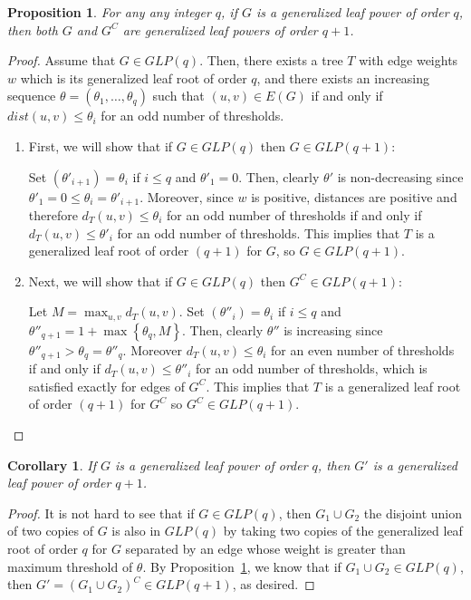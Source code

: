 \documentclass[11pt, letter]{article}
\newtheorem{cor}[theorem]{Corollary}
\newtheorem{proposition}[theorem]{Proposition}
\theoremstyle{remark}
\newcommand{\set}[1]{\left\{#1\right\}}
\begin{document}
\begin{proposition}\label{prop:GLP-Closure}
    For any any integer $q$, if $G$ is a generalized leaf power of order $q$, then both $G$ and $G^C$ are generalized leaf powers of order $q+1$.
\end{proposition}

\begin{proof}
    Assume that $G\in GLP(q)$. Then, there exists a tree $T$ with edge weights $w$ which is its generalized leaf root of order $q$, and there exists an increasing sequence $\theta = (\theta_1, \dots, \theta_q)$ such that $(u,v)\in E(G)$ if and only if $dist(u,v)\leq \theta_i$ for an odd number of thresholds. 

    \begin{enumerate}
        \item First, we will show that if $G\in GLP(q)$ then $G\in GLP(q+1)$:

        Set $(\theta'_{i+1})=\theta_i$ if $i\leq q$ and $\theta'_1=0$. Then, clearly $\theta'$ is non-decreasing since $\theta'_1=0\leq \theta_i=\theta'_{i+1}$. Moreover, since $w$ is positive, distances are positive and therefore $d_T(u,v)\leq \theta_i$ for an odd number of thresholds if and only if $d_T(u,v)\leq \theta'_i$ for an odd number of thresholds. This implies that $T$ is a generalized leaf root of order $(q+1)$ for $G$, so $G\in GLP(q+1)$.
        
        \item Next, we will show that if $G\in GLP(q)$ then $G^C\in GLP(q+1)$:
        
        Let $M=\max_{u,v} d_T(u,v)$. Set $(\theta''_i)=\theta_i$ if $i\leq q$ and $\theta''_{q+1}=1+\max\set{\theta_q,M}$. Then, clearly $\theta''$ is increasing since $\theta''_{q+1}>\theta_q=\theta''_q$. Moreover $d_T(u,v)\leq \theta_i$ for an even number of thresholds if and only if $d_T(u,v)\leq \theta''_i$ for an odd number of thresholds, which is satisfied exactly for edges of $G^C$. This implies that $T$ is a generalized leaf root of order $(q+1)$ for $G^C$ so $G^C\in GLP(q+1)$.
    \end{enumerate}
\end{proof}



\begin{cor}\label{cor:reduction}
    If $G$ is a generalized leaf power of order $q$, then $G'$ is a generalized leaf power of order $q+1$.
\end{cor}

\begin{proof}
    It is not hard to see that if $G\in GLP(q)$, then $G_1\cup G_2$ the disjoint union of two copies of $G$ is also in $GLP(q)$ by taking two copies of the generalized 
    leaf root of order $q$ for $G$ separated by an edge whose weight is greater than maximum threshold of $\theta$. By Proposition~\ref{prop:GLP-Closure}, we know that if $G_1\cup G_2\in GLP(q)$, then $G'=(G_1\cup G_2)^C\in GLP(q+1)$, as desired. 
\end{proof}
\end{document}
